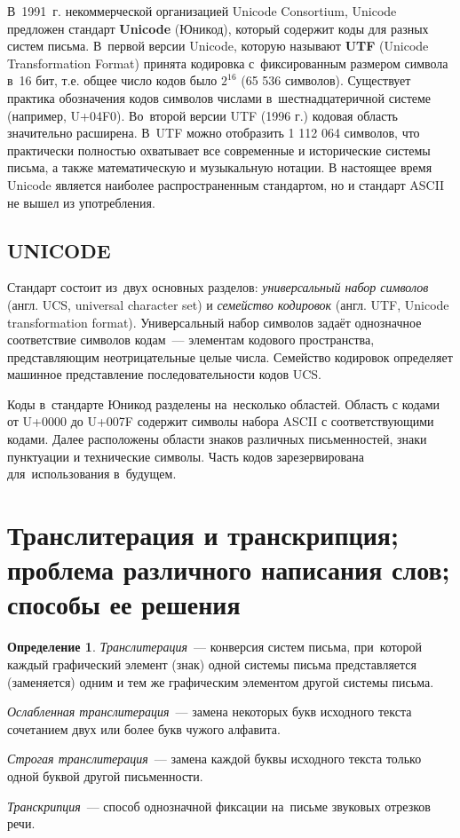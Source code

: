 \documentclass[12pt]{article}
\theoremstyle{definition}
\newtheorem*{defn}{Определение}
\theoremstyle{remark}
\numberwithin{equation}{section}
\begin{document}
В~1991~г. некоммерческой организацией Unicode Consortium, Unicode предложен стандарт
\textbf{Unicode} (Юникод), который содержит коды для разных систем письма.
В~первой версии Unicode, которую называют \textbf{UTF} (Unicode
Transformation Format) принята кодировка с~фиксированным размером символа в~16 бит,
т.е. общее число кодов было $2^{16}$ (65 536 символов). Существует практика
обозначения кодов символов числами в~шестнадцатеричной системе (например, U+04F0).
Во~второй версии UTF (1996 г.) кодовая область значительно расширена.
В~UTF можно отобразить 1 112 064 символов, что практически полностью
охватывает все современные и исторические системы письма, а также математическую
и музыкальную нотации. В настоящее время Unicode является наиболее распространенным
стандартом, но и стандарт ASCII не вышел из употребления.

\subsection{UNICODE}
Стандарт состоит из~двух основных разделов: \textsl{универсальный набор символов}
(англ. UCS, universal character set) и \textsl{семейство кодировок} (англ. UTF,
Unicode transformation format). Универсальный набор символов задаёт однозначное
соответствие символов кодам~--- элементам кодового пространства, представляющим
неотрицательные целые числа. Семейство кодировок определяет машинное представление
последовательности кодов UCS.

Коды в~стандарте Юникод разделены на~несколько областей. Область с кодами от
U+0000 до U+007F содержит символы набора ASCII с соответствующими кодами.
Далее расположены области знаков различных письменностей, знаки пунктуации и
технические символы. Часть кодов зарезервирована для~использования в~будущем.

\section{Транслитерация и транскрипция; проблема различного написания слов;
способы ее решения}
\begin{defn}
\textsl{Транслитерация}~--- конверсия систем письма, при~которой каждый
графический элемент (знак) одной системы письма представляется (заменяется)
одним и тем же графическим элементом другой системы письма.

\textsl{Ослабленная транслитерация}~--- замена некоторых букв исходного текста
сочетанием двух или более букв чужого алфавита.

\textsl{Строгая транслитерация}~--- замена каждой буквы исходного текста
только одной буквой другой письменности.

\textsl{Транскрипция}~--- способ однозначной фиксации на~письме звуковых
отрезков речи.
\end{defn}
\end{document}
